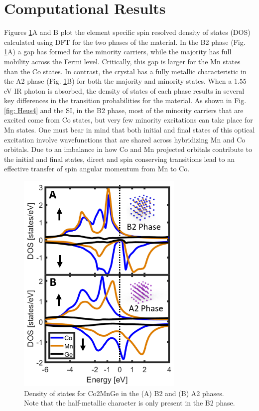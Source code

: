 \section{Computational Results}
Figures \ref{fig: Heus3}A and B plot the element specific spin resolved density of states (DOS) calculated using DFT for the two phases of the material. In the B2 phase (Fig. \ref{fig: Heus3}A) a gap has formed for the minority carriers, while the majority has full mobility across the Fermi level. Critically, this gap is larger for the Mn states than the Co states. In contrast, the crystal has a fully metallic characteristic in the A2 phase (Fig. \ref{fig: Heus3}B) for both the majority and minority states. When a 1.55 eV IR photon is absorbed, the density of states of each phase results in several key differences in the transition probabilities for the material. As shown in Fig. \ref*{fig: Heus4} and the SI, in the B2 phase, most of the minority carriers that are excited come from Co states, but very few minority excitations can take place for Mn states. One must bear in mind that both initial and final states of this optical excitation involve wavefunctions that are shared across hybridizing Mn and Co orbitals. Due to an imbalance in how Co and Mn projected orbitals contribute to the initial and final states, direct and spin conserving transitions lead to an effective transfer of spin angular momentum from Mn to Co. 

\begin{figure}
	\label{fig: Heus3}
	\begin{center}
		\includegraphics[width=80mm]{figs/Heus3}
	\end{center}
	\caption{Density of states for Co2MnGe in the (A) B2 and (B) A2 phases. Note that the half-metallic character is only present in the B2 phase. }
\end{figure}

